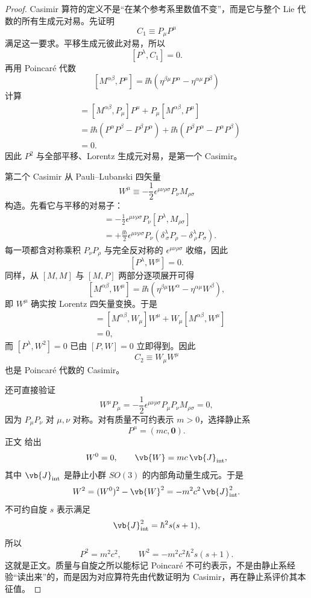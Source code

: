 \begin{proof}
Casimir 算符的定义不是“在某个参考系里数值不变”，而是它与整个 Lie 代数的所有生成元对易。先证明
\[
C_1\equiv P_\mu P^\mu
\]
满足这一要求。平移生成元彼此对易，所以
\[
[P^\lambda,C_1]=0.
\]
再用 Poincar\'e 代数
\[
[M^{\alpha\beta},P^\mu]
=\ii\hbar
\left(
\eta^{\beta\mu}P^\alpha
-\eta^{\alpha\mu}P^\beta
\right)
\]
计算
\begin{align*}
[M^{\alpha\beta},P_\mu P^\mu]
&=[M^{\alpha\beta},P_\mu]P^\mu
+P_\mu[M^{\alpha\beta},P^\mu]\\
&=\ii\hbar
\left(
P^\alpha P^\beta-P^\beta P^\alpha
\right)
+\ii\hbar
\left(
P^\beta P^\alpha-P^\alpha P^\beta
\right)\\
&=0.
\end{align*}
因此 \(P^2\) 与全部平移、Lorentz 生成元对易，是第一个 Casimir。

第二个 Casimir 从 Pauli--Lubanski 四矢量
\[
W^\mu
\equiv
-\frac12\epsilon^{\mu\nu\rho\sigma}
P_\nu M_{\rho\sigma}
\]
构造。先看它与平移的对易子：
\begin{align*}
[P^\lambda,W^\mu]
&=-\frac12\epsilon^{\mu\nu\rho\sigma}
P_\nu[P^\lambda,M_{\rho\sigma}]\\
&=+\frac{\ii\hbar}{2}
\epsilon^{\mu\nu\rho\sigma}
P_\nu
\left(
\delta^\lambda_{\ \sigma}P_\rho
-\delta^\lambda_{\ \rho}P_\sigma
\right).
\end{align*}
每一项都含对称乘积 \(P_\nu P_\rho\) 与完全反对称的
\(\epsilon^{\mu\nu\rho\sigma}\) 收缩，因此
\[
[P^\lambda,W^\mu]=0.
\]
同样，从 \([M,M]\) 与 \([M,P]\) 两部分逐项展开可得
\[
[M^{\alpha\beta},W^\mu]
=\ii\hbar
\left(
\eta^{\beta\mu}W^\alpha
-\eta^{\alpha\mu}W^\beta
\right),
\]
即 \(W^\mu\) 确实按 Lorentz 四矢量变换。于是
\begin{align*}
[M^{\alpha\beta},W_\mu W^\mu]
&=[M^{\alpha\beta},W_\mu]W^\mu
+W_\mu[M^{\alpha\beta},W^\mu]\\
&=0,
\end{align*}
而 \([P^\lambda,W^2]=0\) 已由 \([P,W]=0\) 立即得到。因此
\[
C_2\equiv W_\mu W^\mu
\]
也是 Poincar\'e 代数的 Casimir。

还可直接验证
\[
W^\mu P_\mu
=
-\frac12
\epsilon^{\mu\nu\rho\sigma}
P_\mu P_\nu M_{\rho\sigma}
=0,
\]
因为 \(P_\mu P_\nu\) 对 \(\mu,\nu\) 对称。对有质量不可约表示 \(m>0\)，选择静止系
\[
P^\mu=(mc,\mathbf0).
\]
正文 给出
\[
W^0=0,
\qquad
\vb{W}=mc\,\vb{J}_{\rm int},
\]
其中 \(\vb{J}_{\rm int}\) 是静止小群 \(SO(3)\) 的内部角动量生成元。于是
\[
W^2
=(W^0)^2-\vb{W}^2
=-m^2c^2\,\vb{J}_{\rm int}^2.
\]
不可约自旋 \(s\) 表示满足
\[
\vb{J}_{\rm int}^2
=\hbar^2s(s+1),
\]
所以
\[
{
P^2=m^2c^2,
\qquad
W^2=-m^2c^2\hbar^2s(s+1).
}
\]
这就是正文。质量与自旋之所以能标记 Poincar\'e 不可约表示，不是由静止系经验“读出来”的，而是因为对应算符先由代数证明为 Casimir，再在静止系评价其本征值。
\end{proof}

